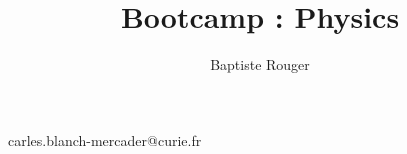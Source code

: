 \documentclass[10pt,a4paper]{article}
\author{Baptiste Rouger}
\title{Bootcamp : Physics}
\begin{document}
\maketitle

\begin{flushright}
carles.blanch-mercader@curie.fr
\end{flushright}

\tableofcontents

\newpage
\end{document}
